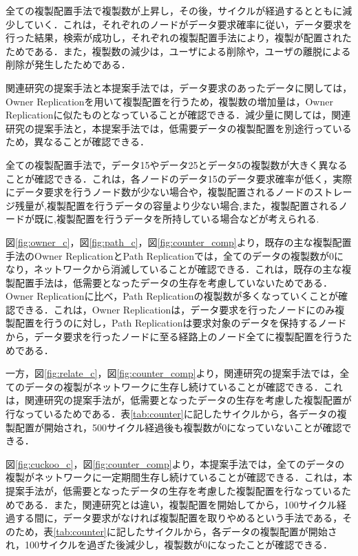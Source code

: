 \documentclass[11pt]{jreport}
\begin{document}
\newpage
\par 全ての複製配置手法で複製数が上昇し，その後，サイクルが経過するとともに減少していく．これは，それぞれのノードがデータ要求確率に従い，データ要求を行った結果，検索が成功し，それぞれの複製配置手法により，複製が配置されたためである．また，複製数の減少は，ユーザによる削除や，ユーザの離脱による削除が発生したためである．
\par 関連研究の提案手法と本提案手法では，データ要求のあったデータに関しては，Owner Replicationを用いて複製配置を行うため，複製数の増加量は，Owner Replicationに似たものとなっていることが確認できる．減少量に関しては，関連研究の提案手法と，本提案手法では，低需要データの複製配置を別途行っているため，異なることが確認できる．
\par 全ての複製配置手法で，データ15やデータ25とデータ5の複製数が大きく異なることが確認できる．これは，各ノードのデータ15のデータ要求確率が低く，実際にデータ要求を行うノード数が少ない場合や，複製配置されるノードのストレージ残量が,複製配置を行うデータの容量より少ない場合,また，複製配置されるノードが既に,複製配置を行うデータを所持している場合などが考えられる.
\par 図\ref{fig:owner_c}，図\ref{fig:path_c}，図\ref{fig:counter_comp}より，既存の主な複製配置手法のOwner ReplicationとPath Replicationでは，全てのデータの複製数が0になり，ネットワークから消滅していることが確認できる．これは，既存の主な複製配置手法は，低需要となったデータの生存を考慮していないためである．
\\Owner Replicationに比べ，Path Replicationの複製数が多くなっていくことが確認できる．これは，Owner Replicationは，データ要求を行ったノードにのみ複製配置を行うのに対し，Path Replicationは要求対象のデータを保持するノードから，データ要求を行ったノードに至る経路上のノード全てに複製配置を行うためである．
\par 一方，図\ref{fig:relate_c}，図\ref{fig:counter_comp}より，関連研究の提案手法では，全てのデータの複製がネットワークに生存し続けていることが確認できる．これは，関連研究の提案手法が，低需要となったデータの生存を考慮した複製配置が行なっているためである．表\ref{tab:counter}に記したサイクルから，各データの複製配置が開始され，500サイクル経過後も複製数が0になっていないことが確認できる．
\par 図\ref{fig:cuckoo_c}，図\ref{fig:counter_comp}より，本提案手法では，全てのデータの複製がネットワークに一定期間生存し続けていることが確認できる．これは，本提案手法が，低需要となったデータの生存を考慮した複製配置を行なっているためである．また，関連研究とは違い，複製配置を開始してから，100サイクル経過する間に，データ要求がなければ複製配置を取りやめるという手法である，そのため，表\ref{tab:counter}に記したサイクルから，各データの複製配置が開始され，100サイクルを過ぎた後減少し，複製数が0になったことが確認できる．
\end{document}
